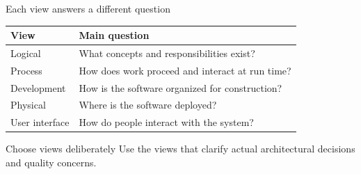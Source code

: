 \begin{frame}{Each view answers a different question}
\small
\begin{tabular}{@{}p{}p{}@{}}
\toprule
View & Main question \\
\midrule
Logical & What concepts and responsibilities exist? \\
Process & How does work proceed and interact at run time? \\
Development & How is the software organized for construction? \\
Physical & Where is the software deployed? \\
User interface & How do people interact with the system? \\
\bottomrule
\end{tabular}
\vspace{0.25cm}
\begin{slidecallout}{Choose views deliberately}
Use the views that clarify actual architectural decisions and quality concerns.
\end{slidecallout}
\end{frame}
